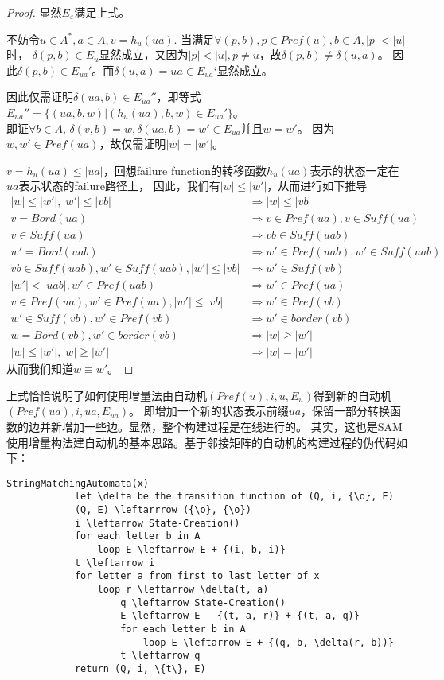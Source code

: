 \documentclass[UTF8]{ctexart}
\theoremstyle{definition}
\theoremstyle{remark}
\numberwithin{equation}{subsection}
\newcommand{\Suff}{\textit{Suff}}
\begin{document}
	\begin{proof}
		显然$E_\varepsilon$满足上式。
		
		不妨令$u \in A^*, a \in A, v = h_u(ua)$.
		当满足$\forall (p,b), p \in Pref(u), b \in A, |p|<|u|$时，
		$\delta(p,b) \in E_u$显然成立，又因为$|p| < |u|, p \neq u$，故$\delta(p,b) \neq \delta(u,a)$。
		因此$\delta(p,b) \in E_{ua}'$。而$\delta(u,a) = ua \in E_{ua}‘$显然成立。
		
		因此仅需证明$\delta(ua,b) \in E_{ua}''$，即等式$E_{ua}'' = \{ (ua,b,w) | (h_u(ua), b, w) \in E_{ua}' \}$。\\
		即证$\forall b \in A$, $\delta(v,b)=w,\delta(ua,b)=w' \in E_{ua}$并且$w = w'$。
		因为$w,w' \in Pref(ua)$，故仅需证明$|w| = |w'|$。
		
		$v = h_u(ua) \le |ua|$，回想failure function的转移函数$h_u(ua)$表示的状态一定在$ua$表示状态的failure路径上，
		因此，我们有$|w| \le |w'|$，从而进行如下推导
		\begin{align*}
			|w| \le |w'|, |w'| \le |vb| 	&\Rightarrow 	|w| \le |vb|			\\
			v = Bord(ua)					&\Rightarrow	v \in Pref(ua), v \in \Suff(ua)	\\
			v \in \Suff(ua) 					&\Rightarrow 	vb \in \Suff(uab)	\\
			w' = Bord(uab) 				&\Rightarrow 	w' \in Pref(uab), w' \in \Suff(uab)	\\
			vb \in \Suff(uab), w' \in \Suff(uab), |w'| \le |vb| &\Rightarrow w' \in \Suff(vb)	\\
			|w'| < |uab|, w' \in Pref(uab)	&\Rightarrow	w' \in Pref(ua)		\\
			v \in Pref(ua), w' \in Pref(ua), |w'| \le |vb|	&\Rightarrow w' \in Pref(vb)	\\
			w' \in \Suff(vb), w' \in Pref(vb) &\Rightarrow 	w' \in border(vb)	\\
			w = Bord(vb), w' \in border(vb) &\Rightarrow 	|w| \ge |w'|	\\
			|w|\le|w'|, |w|\ge|w'|			&\Rightarrow 	|w| = |w'|
		\end{align*}
		从而我们知道$w \equiv w'$。	
	\end{proof}
	上式恰恰说明了如何使用增量法由自动机$(Pref(u), i, {u}, E_u)$得到新的自动机$(Pref(ua), i, {ua}, E_{ua})$。
	即增加一个新的状态表示前缀$ua$，保留一部分转换函数的边并新增加一些边。显然，整个构建过程是在线进行的。
	其实，这也是SAM使用增量构法建自动机的基本思路。基于邻接矩阵的自动机的构建过程的伪代码如下：
	\begin{lstlisting}[frame=shadowbox,framexleftmargin=5mm,rulesepcolor=\color{gray},numbers=none]
		StringMatchingAutomata(x)
			let \delta be the transition function of (Q, i, {\o}, E)
			(Q, E) \leftarrrow ({\o}, {\o})
			i \leftarrow State-Creation()
			for each letter b in A
				loop E \leftarrow E + {(i, b, i)}
			t \leftarrow i
			for letter a from first to last letter of x
				loop r \leftarrow \delta(t, a)
					q \leftarrow State-Creation()
					E \leftarrow E - {(t, a, r)} + {(t, a, q)}
					for each letter b in A
						loop E \leftarrow E + {(q, b, \delta(r, b))}
					t \leftarrow q
			return (Q, i, \{t\}, E)
	\end{lstlisting}
	
\end{document}
